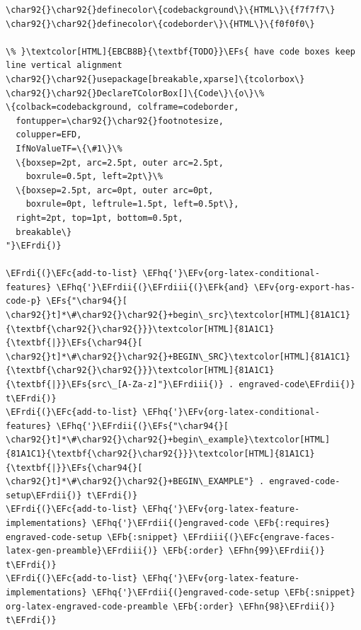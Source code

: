\documentclass{scrartcl}
\newcommand{\EFk}[1]{\textcolor{EFk}{#1}} %
\newcommand{\EFs}[1]{\textcolor{EFs}{#1}} %
\newcommand{\EFb}[1]{\textcolor{EFb}{#1}} %
\newcommand{\EFc}[1]{\textcolor{EFc}{#1}} %
\newcommand{\EFv}[1]{\textcolor{EFv}{#1}} %
\newcommand{\EFhn}[1]{#1} %
\newcommand{\EFhq}[1]{#1} %
\newcommand{\EFrdi}[1]{#1} %
\newcommand{\EFrdii}[1]{#1} %
\newcommand{\EFrdiii}[1]{#1} %
\begin{document}
\begin{Code}
\begin{Verbatim}[]
\char92{}\char92{}definecolor\{codebackground\}\{HTML\}\{f7f7f7\}
\char92{}\char92{}definecolor\{codeborder\}\{HTML\}\{f0f0f0\}

\% }\textcolor[HTML]{EBCB8B}{\textbf{TODO}}\EFs{ have code boxes keep line vertical alignment
\char92{}\char92{}usepackage[breakable,xparse]\{tcolorbox\}
\char92{}\char92{}DeclareTColorBox[]\{Code\}\{o\}\%
\{colback=codebackground, colframe=codeborder,
  fontupper=\char92{}\char92{}footnotesize,
  colupper=EFD,
  IfNoValueTF=\{\#1\}\%
  \{boxsep=2pt, arc=2.5pt, outer arc=2.5pt,
    boxrule=0.5pt, left=2pt\}\%
  \{boxsep=2.5pt, arc=0pt, outer arc=0pt,
    boxrule=0pt, leftrule=1.5pt, left=0.5pt\},
  right=2pt, top=1pt, bottom=0.5pt,
  breakable\}
"}\EFrdi{)}

\EFrdi{(}\EFc{add-to-list} \EFhq{'}\EFv{org-latex-conditional-features} \EFhq{'}\EFrdii{(}\EFrdiii{(}\EFk{and} \EFv{org-export-has-code-p} \EFs{"\char94{}[ \char92{}t]*\#\char92{}\char92{}+begin\_src}\textcolor[HTML]{81A1C1}{\textbf{\char92{}\char92{}}}\textcolor[HTML]{81A1C1}{\textbf{|}}\EFs{\char94{}[ \char92{}t]*\#\char92{}\char92{}+BEGIN\_SRC}\textcolor[HTML]{81A1C1}{\textbf{\char92{}\char92{}}}\textcolor[HTML]{81A1C1}{\textbf{|}}\EFs{src\_[A-Za-z]"}\EFrdiii{)} . engraved-code\EFrdii{)} t\EFrdi{)}
\EFrdi{(}\EFc{add-to-list} \EFhq{'}\EFv{org-latex-conditional-features} \EFhq{'}\EFrdii{(}\EFs{"\char94{}[ \char92{}t]*\#\char92{}\char92{}+begin\_example}\textcolor[HTML]{81A1C1}{\textbf{\char92{}\char92{}}}\textcolor[HTML]{81A1C1}{\textbf{|}}\EFs{\char94{}[ \char92{}t]*\#\char92{}\char92{}+BEGIN\_EXAMPLE"} . engraved-code-setup\EFrdii{)} t\EFrdi{)}
\EFrdi{(}\EFc{add-to-list} \EFhq{'}\EFv{org-latex-feature-implementations} \EFhq{'}\EFrdii{(}engraved-code \EFb{:requires} engraved-code-setup \EFb{:snippet} \EFrdiii{(}\EFc{engrave-faces-latex-gen-preamble}\EFrdiii{)} \EFb{:order} \EFhn{99}\EFrdii{)} t\EFrdi{)}
\EFrdi{(}\EFc{add-to-list} \EFhq{'}\EFv{org-latex-feature-implementations} \EFhq{'}\EFrdii{(}engraved-code-setup \EFb{:snippet} org-latex-engraved-code-preamble \EFb{:order} \EFhn{98}\EFrdii{)} t\EFrdi{)}


\end{Verbatim}
\end{Code}
\end{document}
